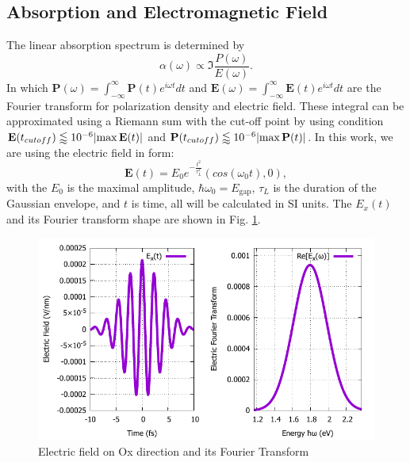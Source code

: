 \documentclass[12pt,english,a4paper]{article}
\begin{document}
\subsection{Absorption and Electromagnetic Field}
\quad The linear absorption spectrum is determined by\cite{haug_quantum_2009}
\begin{equation}
	\alpha(\omega) \propto \Im{\frac{P(\omega)}{E(\omega)}}.
	\label{absorpt}
\end{equation}
\quad In which $\textbf{P}(\omega)= \int_{-\infty}^{\infty}\textbf{P}(t) e^{i\omega t} dt$ and $\textbf{E}(\omega) = \int_{-\infty}^{\infty}\textbf{E}(t) e^{i\omega t} dt$ are the Fourier transform for polarization density and electric field. These integral can be approximated using a Riemann sum with the cut-off point by using condition $\textbf{E}(t_{cutoff}) \lessapprox 10^{-6} \abs{\max{\textbf{E}(t)}}$ and $\textbf{P}(t_{cutoff}) \lessapprox 10^{-6} \abs{\max{\textbf{P}(t)}}$. In this work, we are using the electric field in form:
\begin{equation}
	\textbf{E}(t) = E_0 e^{-\frac{t^2}{\tau_L^2}}(cos(\omega_0t), 0),
\end{equation} 
with the $E_0$ is the maximal amplitude, $\hbar\omega_0 = E_{\mathrm{gap}}$, $\tau_L$ is the duration of the Gaussian envelope, and $t$ is time, all will be calculated in SI units. The $E_x(t)$ and its Fourier transform shape are shown in Fig. \ref{Et}.\\
\begin{figure}
	\begin{center}
\includegraphics[width = 0.75\linewidth]{Images/EAt.pdf}
\caption{Electric field on Ox direction and its Fourier Transform}
\label{Et}
	\end{center}
\end{figure}
\end{document}
